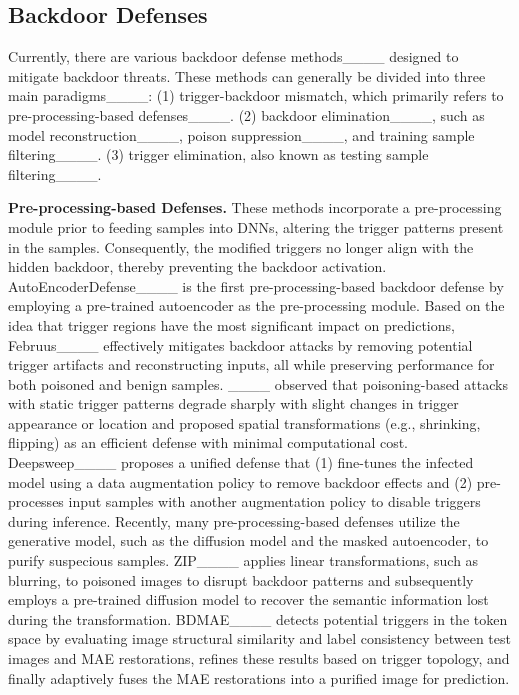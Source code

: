 
\subsection{Backdoor Defenses}

Currently, there are various backdoor defense methods____ designed to mitigate backdoor threats. These methods can generally be divided into three main paradigms____: (1) trigger-backdoor mismatch, which primarily refers to pre-processing-based defenses____. (2) backdoor elimination____, such as model reconstruction____, poison suppression____, and training sample filtering____. (3) trigger elimination, also known as testing sample filtering____.

\textbf{Pre-processing-based Defenses.}
These methods incorporate a pre-processing module prior to feeding samples into DNNs, altering the trigger patterns present in the samples. Consequently, the modified triggers no longer align with the hidden backdoor, thereby preventing the backdoor activation. AutoEncoderDefense____ is the first pre-processing-based backdoor defense by employing a pre-trained autoencoder as the pre-processing module. Based on the idea that trigger regions have the most significant impact on predictions, Februus____ effectively mitigates backdoor attacks by removing potential trigger artifacts and reconstructing inputs, all while preserving performance for both poisoned and benign samples. ____ observed that poisoning-based attacks with static trigger patterns degrade sharply with slight changes in trigger appearance or location and proposed spatial transformations (e.g., shrinking, flipping) as an efficient defense with minimal computational cost. Deepsweep____ proposes a unified defense that (1) fine-tunes the infected model using a data augmentation policy to remove backdoor effects and (2) pre-processes input samples with another augmentation policy to disable triggers during inference. Recently, many pre-processing-based defenses utilize the generative model, such as the diffusion model and the masked autoencoder, to purify suspecious samples. ZIP____ applies linear transformations, such as blurring, to poisoned images to disrupt backdoor patterns and subsequently employs a pre-trained diffusion model to recover the semantic information lost during the transformation. BDMAE____ detects potential triggers in the token space by evaluating image structural similarity and label consistency between test images and MAE restorations, refines these results based on trigger topology, and finally adaptively fuses the MAE restorations into a purified image for prediction.  

